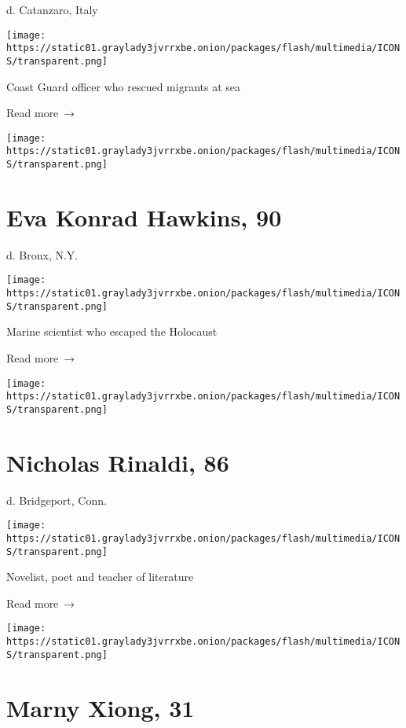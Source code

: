 d. Catanzaro, Italy

\texttt{[image: https://static01.graylady3jvrrxbe.onion/packages/flash/multimedia/ICONS/transparent.png]}

Coast Guard officer who rescued migrants at sea

 Read more~→

\href{https://www.nytimes3xbfgragh.onion/2020/06/11/obituaries/eva-konrad-hawkins-dead-coronavirus.html}{}

\texttt{[image: https://static01.graylady3jvrrxbe.onion/packages/flash/multimedia/ICONS/transparent.png]}

\hypertarget{eva-konrad-hawkins-90}{%
\section{Eva Konrad Hawkins, 90}\label{eva-konrad-hawkins-90}}

d. Bronx, N.Y.

\texttt{[image: https://static01.graylady3jvrrxbe.onion/packages/flash/multimedia/ICONS/transparent.png]}

Marine scientist who escaped the Holocaust

 Read more~→

\href{https://www.nytimes3xbfgragh.onion/2020/06/11/books/nicholas-rinaldi-dead-coronavirus.html}{}

\texttt{[image: https://static01.graylady3jvrrxbe.onion/packages/flash/multimedia/ICONS/transparent.png]}

\hypertarget{nicholas-rinaldi-86}{%
\section{Nicholas Rinaldi, 86}\label{nicholas-rinaldi-86}}

d. Bridgeport, Conn.

\texttt{[image: https://static01.graylady3jvrrxbe.onion/packages/flash/multimedia/ICONS/transparent.png]}

Novelist, poet and teacher of literature

 Read more~→

\href{https://www.nytimes3xbfgragh.onion/2020/06/10/obituaries/marny-xiong-dead-coronavirus.html}{}

\texttt{[image: https://static01.graylady3jvrrxbe.onion/packages/flash/multimedia/ICONS/transparent.png]}

\hypertarget{marny-xiong-31}{%
\section{Marny Xiong, 31}\label{marny-xiong-31}}

